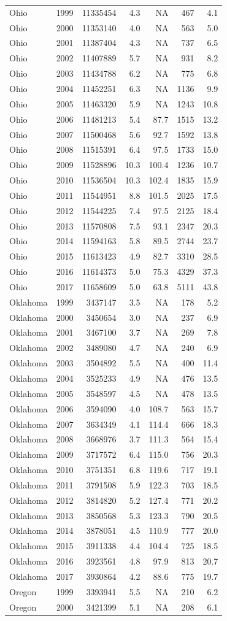 \documentclass[
]{article}
\begin{document}
\begin{longtable}[]{@{}lrrrrrr@{}}
Ohio & 1999 & 11335454 & 4.3 & NA & 467 & 4.1\tabularnewline
Ohio & 2000 & 11353140 & 4.0 & NA & 563 & 5.0\tabularnewline
Ohio & 2001 & 11387404 & 4.3 & NA & 737 & 6.5\tabularnewline
Ohio & 2002 & 11407889 & 5.7 & NA & 931 & 8.2\tabularnewline
Ohio & 2003 & 11434788 & 6.2 & NA & 775 & 6.8\tabularnewline
Ohio & 2004 & 11452251 & 6.3 & NA & 1136 & 9.9\tabularnewline
Ohio & 2005 & 11463320 & 5.9 & NA & 1243 & 10.8\tabularnewline
Ohio & 2006 & 11481213 & 5.4 & 87.7 & 1515 & 13.2\tabularnewline
Ohio & 2007 & 11500468 & 5.6 & 92.7 & 1592 & 13.8\tabularnewline
Ohio & 2008 & 11515391 & 6.4 & 97.5 & 1733 & 15.0\tabularnewline
Ohio & 2009 & 11528896 & 10.3 & 100.4 & 1236 & 10.7\tabularnewline
Ohio & 2010 & 11536504 & 10.3 & 102.4 & 1835 & 15.9\tabularnewline
Ohio & 2011 & 11544951 & 8.8 & 101.5 & 2025 & 17.5\tabularnewline
Ohio & 2012 & 11544225 & 7.4 & 97.5 & 2125 & 18.4\tabularnewline
Ohio & 2013 & 11570808 & 7.5 & 93.1 & 2347 & 20.3\tabularnewline
Ohio & 2014 & 11594163 & 5.8 & 89.5 & 2744 & 23.7\tabularnewline
Ohio & 2015 & 11613423 & 4.9 & 82.7 & 3310 & 28.5\tabularnewline
Ohio & 2016 & 11614373 & 5.0 & 75.3 & 4329 & 37.3\tabularnewline
Ohio & 2017 & 11658609 & 5.0 & 63.8 & 5111 & 43.8\tabularnewline
Oklahoma & 1999 & 3437147 & 3.5 & NA & 178 & 5.2\tabularnewline
Oklahoma & 2000 & 3450654 & 3.0 & NA & 237 & 6.9\tabularnewline
Oklahoma & 2001 & 3467100 & 3.7 & NA & 269 & 7.8\tabularnewline
Oklahoma & 2002 & 3489080 & 4.7 & NA & 240 & 6.9\tabularnewline
Oklahoma & 2003 & 3504892 & 5.5 & NA & 400 & 11.4\tabularnewline
Oklahoma & 2004 & 3525233 & 4.9 & NA & 476 & 13.5\tabularnewline
Oklahoma & 2005 & 3548597 & 4.5 & NA & 478 & 13.5\tabularnewline
Oklahoma & 2006 & 3594090 & 4.0 & 108.7 & 563 & 15.7\tabularnewline
Oklahoma & 2007 & 3634349 & 4.1 & 114.4 & 666 & 18.3\tabularnewline
Oklahoma & 2008 & 3668976 & 3.7 & 111.3 & 564 & 15.4\tabularnewline
Oklahoma & 2009 & 3717572 & 6.4 & 115.0 & 756 & 20.3\tabularnewline
Oklahoma & 2010 & 3751351 & 6.8 & 119.6 & 717 & 19.1\tabularnewline
Oklahoma & 2011 & 3791508 & 5.9 & 122.3 & 703 & 18.5\tabularnewline
Oklahoma & 2012 & 3814820 & 5.2 & 127.4 & 771 & 20.2\tabularnewline
Oklahoma & 2013 & 3850568 & 5.3 & 123.3 & 790 & 20.5\tabularnewline
Oklahoma & 2014 & 3878051 & 4.5 & 110.9 & 777 & 20.0\tabularnewline
Oklahoma & 2015 & 3911338 & 4.4 & 104.4 & 725 & 18.5\tabularnewline
Oklahoma & 2016 & 3923561 & 4.8 & 97.9 & 813 & 20.7\tabularnewline
Oklahoma & 2017 & 3930864 & 4.2 & 88.6 & 775 & 19.7\tabularnewline
Oregon & 1999 & 3393941 & 5.5 & NA & 210 & 6.2\tabularnewline
Oregon & 2000 & 3421399 & 5.1 & NA & 208 & 6.1\tabularnewline

\end{longtable}
\end{document}
